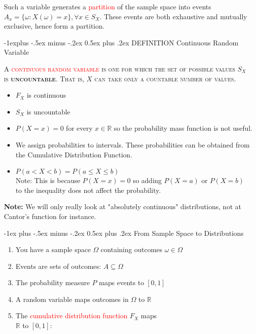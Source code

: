 \documentclass[10pt,landscape]{article}
\makeatletter
\renewcommand{\section}{\@startsection{section}{1}{0mm}%
                                {-1ex plus -.5ex minus -.2ex}%
                                {0.5ex plus .2ex}%
                                {\normalfont\large\bfseries}}
\renewcommand{\subsection}{\@startsection{subsection}{2}{0mm}%
                                {-1explus -.5ex minus -.2ex}%
                                {0.5ex plus .2ex}%
                                {\normalfont\normalsize\bfseries}}
\newcommand{\R}{\mathbb{R}}
\makeatother
\begin{document}
\begin{multicols}{3}
Such a variable generates a \textcolor{red}{partition} of the sample space into events $A_x=\{\omega: X(\omega)=x\}, \forall x\in S_X$. These events are both exhaustive and mutually exclusive, hence form a partition. 


\subsection{DEFINITION \textcolor{OrangeRed3} {Continuous Random Variable}}

\textsc{A \textcolor{red}{continuous random variable} is one for which the set of possible values $S_X$ is \textbf{uncountable}. That is, $X$ can take only a countable number of values.}

\begin{itemize}
	\item $F_X$ is continuous
	\item $S_X$ is uncountable
	\item $P(X=x)=0$ for every $x\in\R$ so the probability mass function is not useful.
	\item We assign probabilities to intervals. These probabilities can be obtained from the Cumulative Distribution Function.
	\item $P(a<X<b)=P(a\leq X \leq b)$ \\ \textcolor{SpringGreen4}{Note: This is because $P(X=x)=0$ so adding $P(X=a)$ or $P(X=b)$ to the inequality does not affect the probability.}
\end{itemize}

\textcolor{SpringGreen4}{\textbf{Note:} We will only really look at "absolutely continuous" distributions, not at Cantor's function for instance.}




\section{From Sample Space to Distributions}

\begin{enumerate}
	\item You have a sample space $\Omega$ containing outcomes $\omega\in\Omega$
	\item Events are sets of outcomes: $A \subseteq \Omega$
	\item The probability measure $P$ maps events to $[0,1]$
	\item A random variable maps outcomes in $\Omega$ to $\R$
	\item The \textcolor{red}{cumulative distribution function} $F_X$ maps\\$\R$ to $[0,1]$:~
	

\end{enumerate}
\end{multicols}
\end{document}
